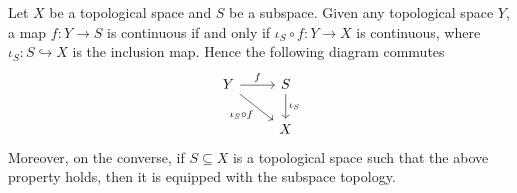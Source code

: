 \begin{theorem}
  Let \(X\) be a topological space and \(S\) be a subspace. Given any
  topological space \(Y\), a map \(f: Y \to S\) is continuous if and only if
  \(\iota_S \circ f : Y \to X\) is continuous, where \(\iota_S: S
  \hookrightarrow X\) is the inclusion map. Hence the following diagram commutes
  \[
    \begin{tikzcd}
      Y \ar[r, "f"] \ar[rd, swap, "\iota_S \circ f"]
        &S \ar[d, "\iota_S"] \\
        &X
    \end{tikzcd}
  \] 
  Moreover, on the converse, if \(S \subseteq X\) is a topological space such
  that the above property holds, then it is equipped with the subspace topology.
\end{theorem}


